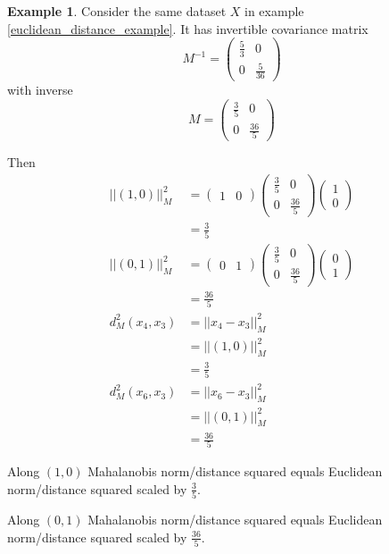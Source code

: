 \documentclass[11pt]{amsart}
\theoremstyle{definition}
\newtheorem{example}[theorem]{Example}
\begin{document}
\begin{example} \label{mahalanobis_distance_example} Consider the same dataset $X$ in example \ref{euclidean_distance_example}. It has invertible covariance matrix
$$M^{-1} = \left( \begin{array}{cc} \frac{5}{3} & 0 \\ 0 & \frac{5}{36} \end{array} \right)$$
with inverse
$$M = \left( \begin{array}{cc} \frac{3}{5} & 0 \\ 0 & \frac{36}{5} \end{array} \right)$$

Then
\begin{align*}
||(1, 0)||_M^2 & = \left( \begin{array}{cc} 1 & 0 \end{array} \right) \left( \begin{array}{cc} \frac{3}{5} & 0 \\ 0 &  \frac{36}{5} \end{array} \right) \left( \begin{array}{c} 1 \\ 0 \end{array} \right) \\
 & = \frac{3}{5} \\
||(0, 1)||_M^2 & = \left( \begin{array}{cc} 0 & 1 \end{array} \right) \left( \begin{array}{cc} \frac{3}{5} & 0 \\ 0 &  \frac{36}{5} \end{array} \right) \left( \begin{array}{c} 0 \\ 1 \end{array} \right) \\
 & = \frac{36}{5} \\
d_M^2 (x_4, x_3) & = ||x_4 - x_3||_M^2 \\
 & =  ||(1, 0)||_M^2 \\
 & = \frac{3}{5} \\
d_M^2 (x_6, x_3) & = ||x_6 - x_3||_M^2 \\
 & = ||(0, 1)||_M^2 \\
 & = \frac{36}{5}
\end{align*}

Along $(1, 0)$ Mahalanobis norm/distance squared equals Euclidean norm/distance squared scaled by $\frac{3}{5}$.

Along $(0, 1)$ Mahalanobis norm/distance squared equals Euclidean norm/distance squared scaled by $\frac{36}{5}$.
\end{example}
\end{document}
